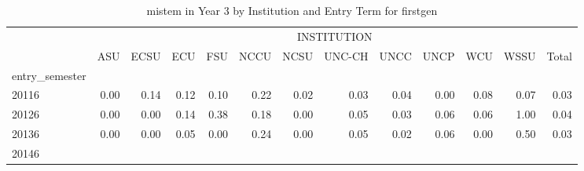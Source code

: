 \begin{table}[!h]
\caption{mistem in Year 3 by Institution and Entry Term for firstgen}
\centering
\begin{tabular}{lllllllllllll}
\cline{1-13}
\multicolumn{1}{c}{} &
  \multicolumn{12}{|c}{INSTITUTION} \\
\multicolumn{1}{c}{} &
  \multicolumn{1}{|r}{ASU} &
  \multicolumn{1}{r}{ECSU} &
  \multicolumn{1}{r}{ECU} &
  \multicolumn{1}{r}{FSU} &
  \multicolumn{1}{r}{NCCU} &
  \multicolumn{1}{r}{NCSU} &
  \multicolumn{1}{r}{UNC-CH} &
  \multicolumn{1}{r}{UNCC} &
  \multicolumn{1}{r}{UNCP} &
  \multicolumn{1}{r}{WCU} &
  \multicolumn{1}{r}{WSSU} &
  \multicolumn{1}{r}{Total} \\
\cline{1-13}
\multicolumn{1}{l}{entry\_semester} &
  \multicolumn{1}{|r}{} &
  \multicolumn{1}{r}{} &
  \multicolumn{1}{r}{} &
  \multicolumn{1}{r}{} &
  \multicolumn{1}{r}{} &
  \multicolumn{1}{r}{} &
  \multicolumn{1}{r}{} &
  \multicolumn{1}{r}{} &
  \multicolumn{1}{r}{} &
  \multicolumn{1}{r}{} &
  \multicolumn{1}{r}{} &
  \multicolumn{1}{r}{} \\
\multicolumn{1}{l}{\hspace{1em}20116} &
  \multicolumn{1}{|r}{0.00} &
  \multicolumn{1}{r}{0.14} &
  \multicolumn{1}{r}{0.12} &
  \multicolumn{1}{r}{0.10} &
  \multicolumn{1}{r}{0.22} &
  \multicolumn{1}{r}{0.02} &
  \multicolumn{1}{r}{0.03} &
  \multicolumn{1}{r}{0.04} &
  \multicolumn{1}{r}{0.00} &
  \multicolumn{1}{r}{0.08} &
  \multicolumn{1}{r}{0.07} &
  \multicolumn{1}{r}{0.03} \\
\multicolumn{1}{l}{\hspace{1em}20126} &
  \multicolumn{1}{|r}{0.00} &
  \multicolumn{1}{r}{0.00} &
  \multicolumn{1}{r}{0.14} &
  \multicolumn{1}{r}{0.38} &
  \multicolumn{1}{r}{0.18} &
  \multicolumn{1}{r}{0.00} &
  \multicolumn{1}{r}{0.05} &
  \multicolumn{1}{r}{0.03} &
  \multicolumn{1}{r}{0.06} &
  \multicolumn{1}{r}{0.06} &
  \multicolumn{1}{r}{1.00} &
  \multicolumn{1}{r}{0.04} \\
\multicolumn{1}{l}{\hspace{1em}20136} &
  \multicolumn{1}{|r}{0.00} &
  \multicolumn{1}{r}{0.00} &
  \multicolumn{1}{r}{0.05} &
  \multicolumn{1}{r}{0.00} &
  \multicolumn{1}{r}{0.24} &
  \multicolumn{1}{r}{0.00} &
  \multicolumn{1}{r}{0.05} &
  \multicolumn{1}{r}{0.02} &
  \multicolumn{1}{r}{0.06} &
  \multicolumn{1}{r}{0.00} &
  \multicolumn{1}{r}{0.50} &
  \multicolumn{1}{r}{0.03} \\
\multicolumn{1}{l}{\hspace{1em}20146} &

\end{tabular}
\end{table}
